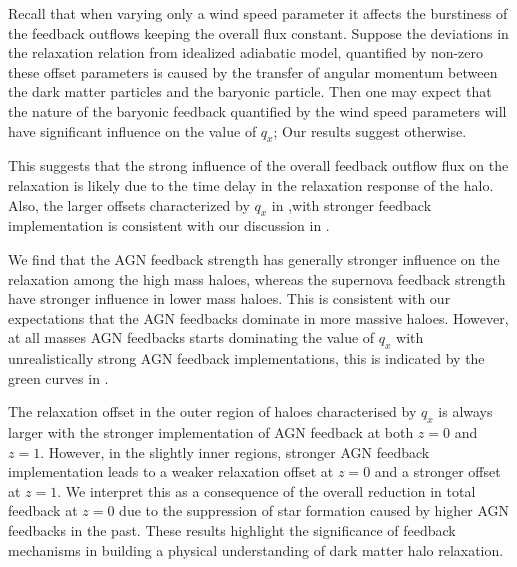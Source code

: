 Recall that when varying only a wind speed parameter it affects the burstiness of the feedback outflows keeping the overall flux constant. Suppose the deviations in the relaxation relation from idealized adiabatic model, quantified by non-zero these offset parameters is caused by the transfer of angular momentum between the dark matter particles and the baryonic particle. Then one may expect that the nature of the baryonic feedback quantified by the wind speed parameters will have significant influence on the value of $q_x$; Our results suggest otherwise. 

This suggests that the strong influence of the overall feedback outflow flux on the relaxation is likely due to the time delay in the relaxation response of the halo. Also, the larger offsets characterized by $q_x$ in ,with stronger feedback implementation is consistent with our discussion in . 

We find that the AGN feedback strength has generally stronger influence on the relaxation among the high mass haloes, whereas the supernova feedback strength have stronger influence in lower mass haloes. This is consistent with our expectations that the AGN feedbacks dominate in more massive haloes. However, at all masses AGN feedbacks starts dominating the value of $q_x$ with unrealistically strong AGN feedback implementations, this is indicated by the green curves in . 

The relaxation offset in the outer region of haloes characterised by $q_x$ is always larger with the stronger implementation of AGN feedback at both \( z=0 \) and \( z=1 \). However, in the slightly inner regions, stronger AGN feedback implementation leads to a weaker relaxation offset at \( z=0 \) and a stronger offset at \( z=1 \). We interpret this as a consequence of the overall reduction in total feedback at \( z=0 \) due to the suppression of star formation caused by higher AGN feedbacks in the past. These results highlight the significance of feedback mechanisms in building a physical understanding of dark matter halo relaxation.

